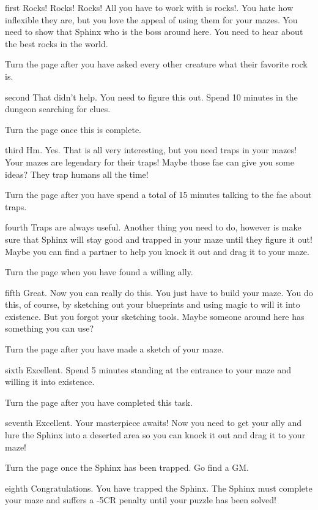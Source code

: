 \documentclass[notebook]{guildcamp2} %
\begin{document}
\startnotebook{\nmazeterpiece{}}

\begin{page}{first}
Rocks! Rocks! Rocks! All you have to work with is rocks!. You hate how inflexible they are, but you love the appeal of using them for your mazes.
You need to show that Sphinx who is the boss around here. You need to hear about the best rocks in the world.

Turn the page after you have asked every other creature what their favorite rock is.
\end{page}
\begin{page}{second}
That didn't help. You need to figure this out. Spend 10 minutes in the dungeon searching for clues.

Turn the page once this is complete.
\end{page}
\begin{page}{third}
Hm. Yes. That is all very interesting, but you need traps in your mazes! Your mazes are legendary for their traps! Maybe those fae can give you some ideas? They trap humans all the time!

Turn the page after you have spend a total of 15 minutes talking to the fae about traps.
\end{page}
\begin{page}{fourth}
Traps are always useful. Another thing you need to do, however is make sure that Sphinx will stay good and trapped in your maze until they figure it out! Maybe you can find a partner to help you knock it out and drag it to your maze.

Turn the page when you have found a willing ally.
\end{page}
\begin{page}{fifth}
Great. Now you can really do this. You just have to build your maze. You do this, of course, by sketching out your blueprints and using magic to will it into existence. But you forgot your sketching tools. Maybe someone around here has something you can use?

Turn the page after you have made a sketch of your maze.
\end{page}
\begin{page}{sixth}
Excellent. Spend 5 minutes standing at the entrance to your maze and willing it into existence. 

Turn the page after you have completed this task.
\end{page}

\begin{page}{seventh}
Excellent. Your masterpiece awaits! Now you need to get your ally and lure the Sphinx into a deserted area so you can knock it out and drag it to your maze!

Turn the page once the Sphinx has been trapped. Go find a GM.
\end{page}
\begin{page}{eighth}
Congratulations. You have trapped the Sphinx. The Sphinx must complete your maze and suffers a -5CR penalty until your puzzle has been solved!
\end{page}

\endnotebook
\end{document}
